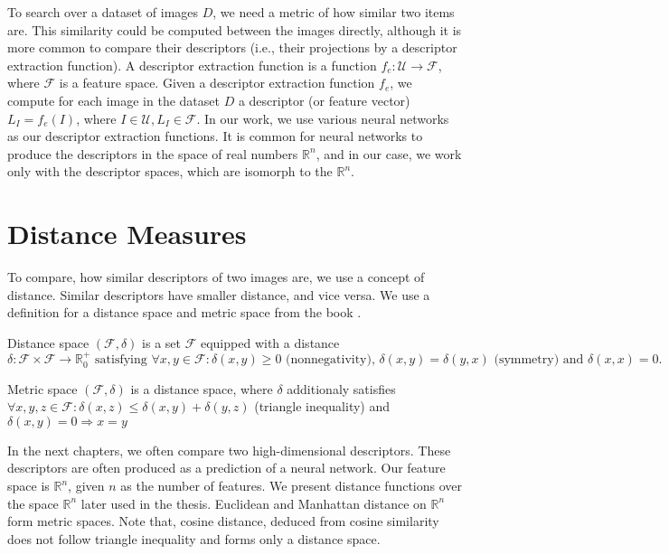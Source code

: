 To search over a dataset of images $D$, we need a metric of how similar two items are. This similarity could be computed between the images directly, although it is more common to compare their descriptors (i.e., their  projections by a descriptor extraction function). A descriptor extraction function is a function $f_e: \mathcal{U} \rightarrow \mathcal{F}$, where $\mathcal{F}$ is a feature space. Given a descriptor extraction function $f_e$, we compute for each image in the dataset $D$ a descriptor (or feature vector) $L_I = f_e(I)$, where $I \in \mathcal{U}, L_I \in \mathcal{F}$. In our work, we use various neural networks as our descriptor extraction functions. It is common for neural networks to produce the descriptors in the space of real numbers $\mathbb{R}^n$, and in our case, we work only with the descriptor spaces, which are isomorph to the $\mathbb{R}^n$.

\section{Distance Measures}

To compare, how similar descriptors of two images are, we use a concept of distance. Similar descriptors have smaller distance, and vice versa. We use a definition for a distance space and metric space from the book \cite{deza2009encyclopedia}.

\theoremstyle{definition}
\begin{definition}{Distance space}
$(\mathcal{F}, \delta )$ is a set $\mathcal{F}$ equipped
with a distance $\delta : \mathcal{F} \times \mathcal{F} \rightarrow \mathbb{R}^+_0 \text{ satisfying } \forall x, y \in \mathcal{F}: \delta(x, y) \geq 0 \text{ (nonnegativity), } \delta(x, y) = \delta(y, x) \text{ (symmetry) and } \delta(x, x) = 0.$
\end{definition}

\theoremstyle{definition}
\begin{definition}{Metric space}
$(\mathcal{F}, \delta)$ is a distance space, where $\delta$ additionaly satisfies $\forall x, y, z \in \mathcal{F} : \delta(x,z) \leq \delta(x,y) + \delta(y,z)$ (triangle inequality) and $\delta(x, y) = 0 \Rightarrow x = y$
\end{definition}

In the next chapters, we often compare two high-dimensional descriptors. These descriptors are often produced as a prediction of a neural network. Our feature space is $\mathbb{R}^n$, given $n$ as the number of features. We present distance functions over the space $\mathbb{R}^n$ later used in the thesis. Euclidean and Manhattan distance on $\mathbb{R}^n$ form metric spaces. Note that, cosine distance, deduced from cosine similarity does not follow triangle inequality and forms only a distance space.

